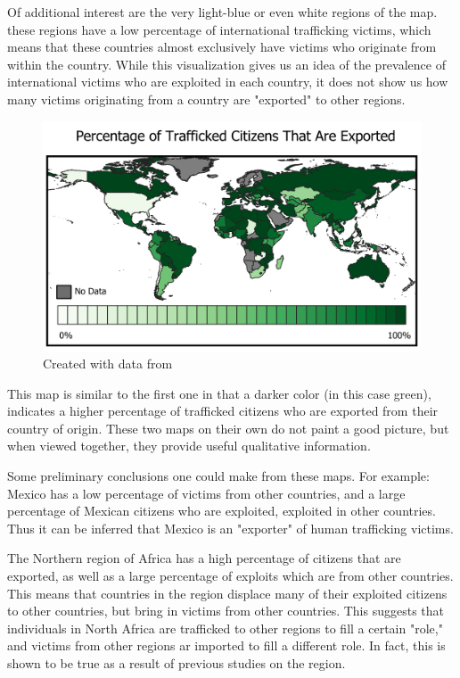 \documentclass{article} %
\begin{document}
Of additional interest are the very light-blue or even white regions of the map. these regions have a low percentage of international trafficking victims, which means that these countries almost exclusively have victims who originate from within the country. While this visualization gives us an idea of the prevalence of international victims who are exploited in each country, it does not show us how many victims originating from a country are "exported" to other regions.

\FloatBarrier

\begin{center}
	\begin{figure}[H]
		\includegraphics[width = \textwidth]{ProposalMap2}
		\scriptsize{\caption{Created with data from \cite{CTDC}}}
	\end{figure}
\end{center}
\FloatBarrier

This map is similar to the first one in that a darker color (in this case green), indicates a higher percentage of trafficked citizens who are exported from their country of origin. These two maps on their own do not paint a good picture, but when viewed together, they provide useful qualitative information.

Some preliminary conclusions one could make from these maps. For example: Mexico has a low percentage of victims from other countries, and a large percentage of Mexican citizens who are exploited, exploited in other countries. Thus it can be inferred that Mexico is an "exporter" of human trafficking victims.

The Northern region of Africa has a high percentage of citizens that are exported, as well as a large percentage of exploits which are from other countries. This means that countries in the region displace many of their exploited citizens to other countries, but bring in victims from other countries. This suggests that individuals in North Africa are trafficked to other regions to fill a certain "role," and victims from other regions ar imported to fill a different role. In fact, this is shown to be true as a result of previous studies on the region.
\end{document}

